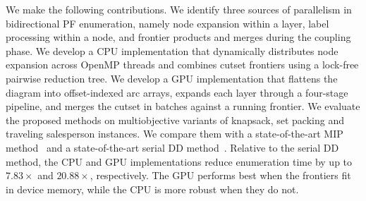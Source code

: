 \documentclass[letterpaper]{article}
\begin{document}
We make the following contributions. We identify three sources of parallelism in bidirectional PF enumeration, namely node expansion within a layer, label processing within a node, and frontier products and merges during the coupling phase. We develop a CPU implementation that dynamically distributes node expansion across OpenMP threads and combines cutset frontiers using a lock-free pairwise reduction tree. We develop a GPU implementation that flattens the diagram into offset-indexed arc arrays, expands each layer through a four-stage pipeline, and merges the cutset in batches against a running frontier. We evaluate the proposed methods on multiobjective variants of knapsack, set packing and traveling salesperson instances. We compare them with a state-of-the-art MIP method~\citep{dachert2024simple} and a state-of-the-art serial DD method~\citep{bergman2022network}. Relative to the serial DD method, the CPU and GPU implementations reduce enumeration time by up to $7.83\times$ and $20.88\times$, respectively. The GPU performs best when the frontiers fit in device memory, while the CPU is more robust when they do not.

\end{document}
